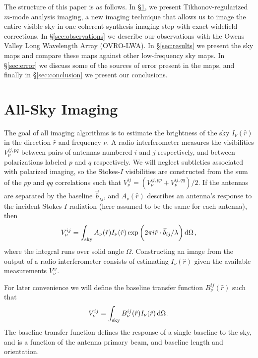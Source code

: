 \documentclass[twocolumn]{aastex61}
\renewcommand{\d}{{\rm d}}
\begin{document}
The structure of this paper is as follows. In \S\ref{sec:imaging}, we present Tikhonov-regularized
$m$-mode analysis imaging, a new imaging technique that allows us to image the entire visible sky in
one coherent synthesis imaging step with exact widefield corrections. In \S\ref{sec:observations} we
describe our observations with the Owens Valley Long Wavelength Array (OVRO-LWA). In
\S\ref{sec:results} we present the sky maps and compare these maps against other low-frequency sky
maps.  In \S\ref{sec:error} we discuss some of the sources of error present in the maps, and finally
in \S\ref{sec:conclusion} we present our conclusions.

\section{All-Sky Imaging}\label{sec:imaging}

The goal of all imaging algorithms is to estimate the brightness of the sky $I_\nu(\hat r)$ in the
direction $\hat r$ and frequency $\nu$.  A radio interferometer measures the visibilities
$V^{ij,pq}_{\nu}$ between pairs of antennas numbered $i$ and $j$ respectively, and between
polarizations labeled $p$ and $q$ respectively. We will neglect subtleties associated with polarized
imaging, so the Stokes-$I$ visibilities are constructed from the sum of the $pp$ and $qq$
correlations such that $V^{ij}_{\nu} = (V^{ij,pp}_{\nu}+V^{ij,qq}_{\nu})/2$.  If the antennas are
separated by the baseline $\vec b_{ij}$, and $A_\nu(\hat r)$ describes an antenna's response to the
incident Stokes-$I$ radiation (here assumed to be the same for each antenna), then
\begin{equation}\label{eq:basic-imaging}
    V^{ij}_\nu = \int_\text{sky}
                 A_\nu(\hat r) I_\nu(\hat r)
                 \exp\bigg(2\pi i \hat r\cdot\vec b_{ij}/\lambda\bigg) \,\d\Omega \, ,
\end{equation}
where the integral runs over solid angle $\Omega$.  Constructing an image from the output of a radio
interferometer consists of estimating $I_\nu(\hat r)$ given the available measurements $V^{ij}_\nu$.

For later convenience we will define the baseline transfer function $B^{ij}_\nu(\hat r)$ such that
\begin{equation}\label{eq:baseline-transfer-function}
    V^{ij}_\nu = \int_\text{sky} B^{ij}_\nu(\hat r) I_\nu(\hat r) \,\d\Omega \, .
\end{equation}
The baseline transfer function defines the response of a single baseline to the sky, and is a
function of the antenna primary beam, and baseline length and orientation.
\end{document}
